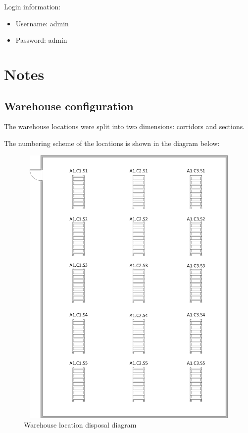 \documentclass[a4paper]{article}
\begin{document}
Login information:

\begin{itemize}
	\item Username: admin
	\item Password: admin
\end{itemize}

\newpage

\section{Notes}
\subsection{Warehouse configuration}
The warehouse locations were split into two dimensions: corridors and sections.

The numbering scheme of the locations is shown in the diagram below:

\begin{figure}[h!]
\centerline{\includegraphics[height=14cm, width=12cm]{DrawingRacks.png}}
\caption{Warehouse location disposal diagram}
\end{figure}

\newpage
\end{document}
